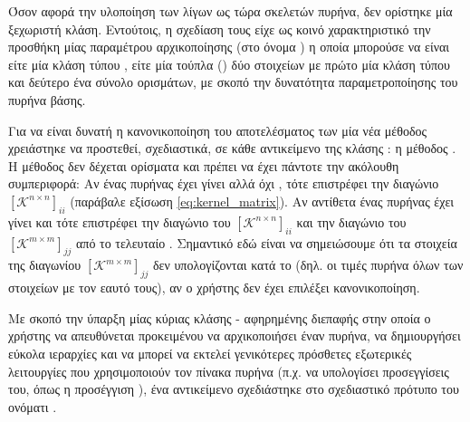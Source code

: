 Όσον αφορά την υλοποίηση των λίγων ως τώρα σκελετών πυρήνα, δεν ορίστηκε μία ξεχωριστή κλάση.
Εντούτοις, η σχεδίαση τους είχε ως κοινό χαρακτηριστικό την προσθήκη μίας παραμέτρου αρχικοποίησης (στο όνομα ) η οποία μπορούσε να είναι είτε μία κλάση τύπου , είτε μία τούπλα () δύο στοιχείων με πρώτο μία κλάση τύπου  και δεύτερο ένα σύνολο ορισμάτων, με σκοπό την δυνατότητα παραμετροποίησης του πυρήνα βάσης.\par
Για να είναι δυνατή η κανονικοποίηση του αποτελέσματος των  μία νέα μέθοδος χρειάστηκε να προστεθεί, σχεδιαστικά, σε κάθε αντικείμενο της κλάσης : η μέθοδος .
Η μέθοδος δεν δέχεται ορίσματα και πρέπει να έχει πάντοτε την ακόλουθη συμπεριφορά:
Αν ένας πυρήνας έχει γίνει  αλλά όχι , τότε επιστρέφει την διαγώνιο $[\mathcal{K}^{n\times n}]_{ii}$ (παράβαλε εξίσωση \ref{eq:kernel_matrix}).
Αν αντίθετα ένας πυρήνας έχει γίνει  και  τότε επιστρέφει την διαγώνιο του $[\mathcal{K}^{n\times n}]_{ii}$ και την διαγώνιο του $[\mathcal{K}^{m\times m}]_{jj}$ από το τελευταίο .
Σημαντικό εδώ είναι να σημειώσουμε ότι τα στοιχεία της διαγωνίου $[\mathcal{K}^{m\times m}]_{jj}$ δεν υπολογίζονται κατά το  (δηλ. οι τιμές πυρήνα όλων των στοιχείων με τον εαυτό τους), αν ο χρήστης δεν έχει επιλέξει κανονικοποίηση.\par
Με σκοπό την ύπαρξη μίας κύριας κλάσης - αφηρημένης διεπαφής στην οποία ο χρήστης να απευθύνεται προκειμένου να αρχικοποιήσει έναν πυρήνα, να δημιουργήσει εύκολα ιεραρχίες  και να μπορεί να εκτελεί γενικότερες πρόσθετες εξωτερικές λειτουργίες που χρησιμοποιούν τον πίνακα πυρήνα (π.χ. να υπολογίσει προσεγγίσεις του, όπως η προσέγγιση ), ένα αντικείμενο σχεδιάστηκε στο σχεδιαστικό πρότυπο του  ονόματι \texttt{}.
